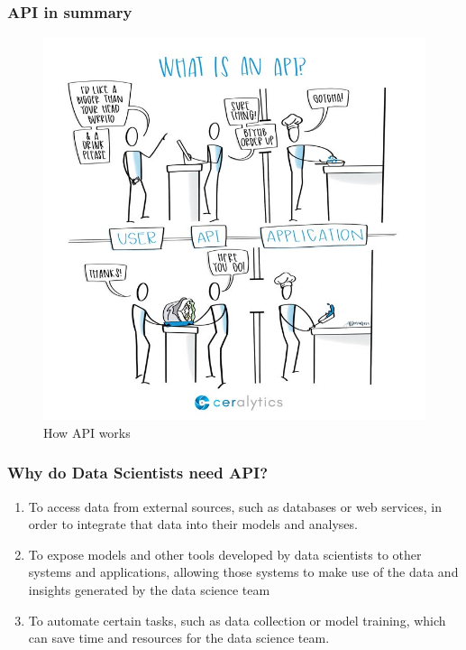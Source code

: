 \documentclass[aspectratio=169]{beamer}
\begin{document}
\begin{frame}
    \frametitle{API in summary}
    \begin{figure}
        \includegraphics[scale=.25]{./images/what-is-api.jpg}
        \caption{How API works}
        \label{figure:background-story}
    \end{figure}    
\end{frame}

\begin{frame}
    \frametitle{Why do Data Scientists need API?}
    \begin{enumerate}
        \item To access data from external sources, such as databases or web services, in order to integrate that data into their models and analyses. 
        \item To expose models and other tools developed by data scientists to other systems and applications, allowing those systems to make use of the data and insights generated by the data science team
        \item To automate certain tasks, such as data collection or model training, which can save time and resources for the data science team.
    \end{enumerate}
\end{frame}
\end{document}
